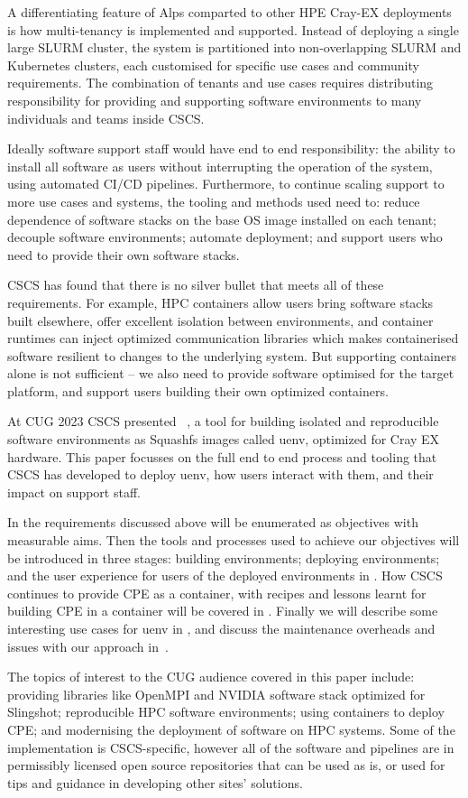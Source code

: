 A differentiating feature of Alps comparted to other HPE Cray-EX deployments is how multi-tenancy is implemented and supported.
Instead of deploying a single large SLURM cluster, the system is partitioned into non-overlapping SLURM and Kubernetes clusters, each customised for specific use cases and community requirements.
The combination of tenants and use cases requires distributing responsibility for providing and supporting software environments to many individuals and teams inside CSCS.

Ideally software support staff would have end to end responsibility: the ability to install all software as users without interrupting the operation of the system, using automated CI/CD pipelines.
Furthermore, to continue scaling support to more use cases and systems, the tooling and methods used need to: reduce dependence of software stacks on the base OS image installed on each tenant; decouple software environments; automate deployment; and support users who need to provide their own software stacks.

CSCS has found that there is no silver bullet that meets all of these requirements.
For example, HPC containers allow users bring software stacks built elsewhere, offer excellent isolation between environments, and container runtimes can inject optimized communication libraries which makes containerised software resilient to changes to the underlying system.
But supporting containers alone is not sufficient -- we also need to provide software optimised for the target platform, and support users building their own optimized containers.

At CUG 2023 CSCS presented \stackinator~\cite{uenv2023}, a tool for building isolated and reproducible software environments as Squashfs images called uenv, optimized for Cray EX hardware.
This paper focusses on the full end to end process and tooling that CSCS has developed to deploy uenv, how users interact with them, and their impact on support staff.

In  the requirements discussed above will be enumerated as objectives with measurable aims.
Then the tools and processes used to achieve our objectives will be introduced in three stages: building environments; deploying environments; and the user experience for users of the deployed environments in .
How CSCS continues to provide CPE as a container, with recipes and lessons learnt for building CPE in a container will be covered in .
Finally we will describe some interesting use cases for uenv in , and discuss the maintenance overheads and issues with our approach in~.

The topics of interest to the CUG audience covered in this paper include: providing libraries like OpenMPI and NVIDIA software stack optimized for Slingshot; reproducible HPC software environments; using containers to deploy CPE; and modernising the deployment of software on HPC systems.
Some of the implementation is CSCS-specific, however all of the software and pipelines are in permissibly licensed open source repositories that can be used as is, or used for tips and guidance in developing other sites' solutions.

